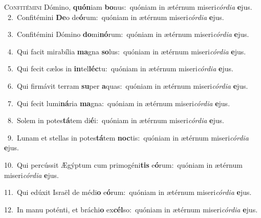 \lettrine{\initial\textcolor{\initialcolor}{C}}{onfitémini} Dómino, \textbf{quón}\-iam \textbf{bo}\-nus:~\star quóniam in ætérnum miseri\-\textit{cór}\-\textit{di}\textit{a} \textbf{e}\-jus.\\
{\numbfont\textcolor{\numbcolor}{~2.}}~Confitémini \textbf{De}\-o de\-\textbf{ó}\-rum:~\star quóniam in ætérnum miseri\-\textit{cór}\-\textit{di}\textit{a} \textbf{e}\-jus.\par
{\numbfont\textcolor{\numbcolor}{~3.}}~Confitémini Dómino \textbf{do}\-mi\-\textbf{nó}\-rum:~\star quóniam in ætérnum miseri\-\textit{cór}\-\textit{di}\textit{a} \textbf{e}\-jus.\par
{\numbfont\textcolor{\numbcolor}{~4.}}~Qui facit mirabília \textbf{ma}\-gna \textbf{so}\-lus:~\star quóniam in ætérnum miseri\-\textit{cór}\-\textit{di}\textit{a} \textbf{e}\-jus.\par
{\numbfont\textcolor{\numbcolor}{~5.}}~Qui fecit cælos in \textbf{in}\-tel\-\textbf{léc}\-tu:~\star quóniam in ætérnum miseri\-\textit{cór}\-\textit{di}\textit{a} \textbf{e}\-jus.\par
{\numbfont\textcolor{\numbcolor}{~6.}}~Qui firmávit terram \textbf{su}\-per \textbf{a}\-quas:~\star quóniam in ætérnum miseri\-\textit{cór}\-\textit{di}\textit{a} \textbf{e}\-jus.\par
{\numbfont\textcolor{\numbcolor}{~7.}}~Qui fecit lumi\-\textbf{ná}\-ria \textbf{ma}\-gna:~\star quóniam in ætérnum miseri\-\textit{cór}\-\textit{di}\textit{a} \textbf{e}\-jus.\par
{\numbfont\textcolor{\numbcolor}{~8.}}~Solem in potes\-\textbf{tá}\-tem di\-\textbf{é}\-i:~\star quóniam in ætérnum miseri\-\textit{cór}\-\textit{di}\textit{a} \textbf{e}\-jus.\par
{\numbfont\textcolor{\numbcolor}{~9.}}~Lunam et stellas in potes\-\textbf{tá}\-tem \textbf{noc}\-tis:~\star quóniam in ætérnum miseri\-\textit{cór}\-\textit{di}\textit{a} \textbf{e}\-jus.\par
{\numbfont\textcolor{\numbcolor}{10.}}~Qui percússit Ægýptum cum primogéni\textbf{tis} e\-\textbf{ó}\-rum:~\star quóniam in ætérnum miseri\-\textit{cór}\-\textit{di}\textit{a} \textbf{e}\-jus.\par
{\numbfont\textcolor{\numbcolor}{11.}}~Qui edúxit Israël de médi\textbf{o} e\-\textbf{ó}\-rum:~\star quóniam in ætérnum miseri\-\textit{cór}\-\textit{di}\textit{a} \textbf{e}\-jus.\par
{\numbfont\textcolor{\numbcolor}{12.}}~In manu poténti, et bráchi\textbf{o} ex\-\textbf{cél}\-so:~\star quóniam in ætérnum miseri\-\textit{cór}\-\textit{di}\textit{a} \textbf{e}\-jus.\par

